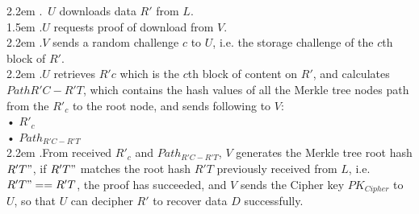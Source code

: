 \documentclass[10pt,a4paper]{article}
\begin{document}
\hangindent 2.2em
.\quad  \,    $U$ downloads data $R'$ from $L$.
\vspace{-0.8em}
\\

\hangindent 1.5em
.\quad $U$ requests proof of download from $V$.
\vspace{-0.8em}
\\

\hangindent 2.2em
.\quad  $V$ sends a random challenge $c$ to $U$, i.e. the storage challenge of the $c$th block of $R'$.
\vspace{-0.8em}
\\

\hangindent 2.2em
.\quad $U$ retrieves $R'{c}$ which is the ${c}$th block of content on $R'$, and calculates $Path{R'C-R'T}$, which contains the hash values of all the Merkle tree nodes path from the $R'_{c}$ to the root node, and sends following to $V$:
\\
    •  $R'_{c}$ \\
   •  $Path_{R'C-R'T}$
    \vspace{-0.5em}
\\

\hangindent 2.2em
.\quad From received $R'_{c}$ and $Path_{R'C-R'T}$, $V$ generates the Merkle tree root hash $R'T"$, if $R'T"$ matches the root hash $R'T$ previously received from $L$, i.e. $R'T" == R'T$, the proof has succeeded, and $V$ sends the Cipher key $PK_{Cipher}$ to $U$, so that $U$ can decipher $R'$ to recover data $D$ successfully.
\vspace{-0.5em}
\end{document}
